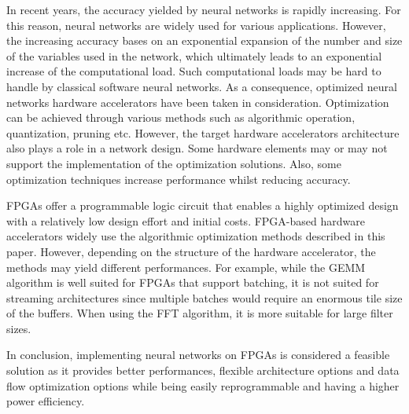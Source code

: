 
In recent years, the accuracy yielded by neural networks is rapidly increasing. For this reason, neural networks are widely used for various applications. However, the increasing accuracy bases on an exponential expansion of the number and size of the variables used in the network, which ultimately leads to an exponential increase of the computational load. Such computational loads may be hard to handle by classical software neural networks. As a consequence, optimized neural networks hardware accelerators have been taken in consideration. Optimization can be achieved through various methods such as algorithmic operation, quantization, pruning etc. However, the target hardware accelerators architecture also plays a role in a network design. Some hardware elements may or may not support the implementation of the optimization solutions. Also, some optimization techniques increase performance whilst reducing accuracy.

FPGAs offer a programmable logic circuit that enables a highly optimized design with a relatively low design effort and initial costs. FPGA-based hardware accelerators widely use the algorithmic optimization methods described in this paper. However, depending on the structure of the hardware accelerator, the methods may yield different performances. For example, while the GEMM algorithm is well suited for FPGAs that support batching, it is not suited for streaming architectures since multiple batches would require an enormous tile size of the buffers. When using the FFT algorithm, it is more suitable for large filter sizes.

In conclusion, implementing neural networks on FPGAs is considered a feasible solution as it provides better performances, flexible architecture options and data flow optimization options while being easily reprogrammable and having a higher power efficiency.